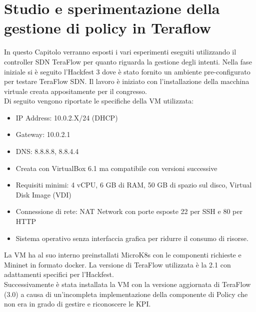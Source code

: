 \chapter{Studio e sperimentazione della gestione di policy in Teraflow}
\label{cap:policy}
In questo Capitolo verranno esposti i vari esperimenti eseguiti utilizzando il controller SDN TeraFlow per quanto riguarda la gestione degli intenti.
Nella fase iniziale si è seguito l'Hackfest 3 \cite{hackfest} dove è stato fornito un ambiente pre-configurato per testare TeraFlow SDN. 
Il lavoro è iniziato con l'installazione della macchina virtuale \cite{VM} creata appositamente per il congresso.
\\Di seguito vengono riportate le specifiche della VM utilizzata:
\begin{itemize}
    \item IP Address: 10.0.2.X/24 (DHCP)
    \item Gateway: 10.0.2.1
    \item DNS: 8.8.8.8, 8.8.4.4
    \item Creata con VirtualBox 6.1 ma compatibile con versioni successive
    \item Requisiti minimi: 4 vCPU, 6 GB di RAM, 50 GB di spazio sul disco, Virtual Disk Image (VDI)
    \item Connessione di rete: NAT Network con porte esposte 22 per SSH e 80 per HTTP
    \item Sistema operativo senza interfaccia grafica per ridurre il consumo di risorse.
\end{itemize}
La VM ha al suo interno preinstallati MicroK8s con le componenti richieste e Mininet in formato docker.
La versione di TeraFlow utilizzata è la 2.1 con adattamenti specifici per l'Hackfest.
\\Successivamente è stata installata la VM con la versione aggiornata di TeraFlow (3.0) a causa di un'incompleta implementazione della componente di Policy che non era in grado di gestire e riconoscere le KPI.
